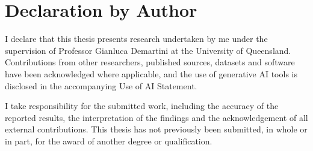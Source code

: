 \chapter*{Declaration by Author}
\thispagestyle{plain}


I declare that this thesis presents research undertaken by me under the
supervision of Professor Gianluca Demartini at the University of Queensland.
Contributions from other researchers, published sources, datasets and software
have been acknowledged where applicable, and the use of generative AI tools
is disclosed in the accompanying Use of AI Statement.

I take responsibility for the submitted work, including the accuracy of the
reported results, the interpretation of the findings and the acknowledgement
of all external contributions. This thesis has not previously been submitted,
in whole or in part, for the award of another degree or qualification.
\clearpage
